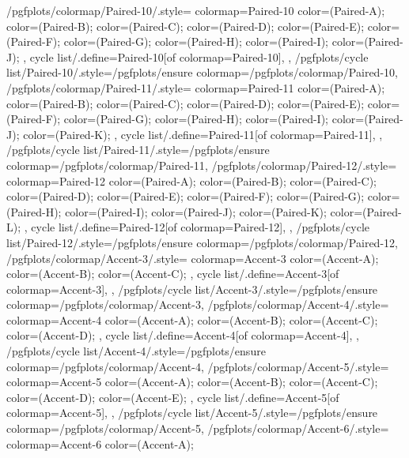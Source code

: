 {  /pgfplots/colormap/Paired-10/.style={
    colormap={Paired-10}{
      color=(Paired-A);
      color=(Paired-B);
      color=(Paired-C);
      color=(Paired-D);
      color=(Paired-E);
      color=(Paired-F);
      color=(Paired-G);
      color=(Paired-H);
      color=(Paired-I);
      color=(Paired-J);
    },
    cycle list/.define={Paired-10}{[of colormap=Paired-10]},
  },
  /pgfplots/cycle list/Paired-10/.style={/pgfplots/ensure colormap={/pgfplots/colormap/Paired-10}},
  /pgfplots/colormap/Paired-11/.style={
    colormap={Paired-11}{
      color=(Paired-A);
      color=(Paired-B);
      color=(Paired-C);
      color=(Paired-D);
      color=(Paired-E);
      color=(Paired-F);
      color=(Paired-G);
      color=(Paired-H);
      color=(Paired-I);
      color=(Paired-J);
      color=(Paired-K);
    },
    cycle list/.define={Paired-11}{[of colormap=Paired-11]},
  },
  /pgfplots/cycle list/Paired-11/.style={/pgfplots/ensure colormap={/pgfplots/colormap/Paired-11}},
  /pgfplots/colormap/Paired-12/.style={
    colormap={Paired-12}{
      color=(Paired-A);
      color=(Paired-B);
      color=(Paired-C);
      color=(Paired-D);
      color=(Paired-E);
      color=(Paired-F);
      color=(Paired-G);
      color=(Paired-H);
      color=(Paired-I);
      color=(Paired-J);
      color=(Paired-K);
      color=(Paired-L);
    },
    cycle list/.define={Paired-12}{[of colormap=Paired-12]},
  },
  /pgfplots/cycle list/Paired-12/.style={/pgfplots/ensure colormap={/pgfplots/colormap/Paired-12}},
  /pgfplots/colormap/Accent-3/.style={
    colormap={Accent-3}{
      color=(Accent-A);
      color=(Accent-B);
      color=(Accent-C);
    },
    cycle list/.define={Accent-3}{[of colormap=Accent-3]},
  },
  /pgfplots/cycle list/Accent-3/.style={/pgfplots/ensure colormap={/pgfplots/colormap/Accent-3}},
  /pgfplots/colormap/Accent-4/.style={
    colormap={Accent-4}{
      color=(Accent-A);
      color=(Accent-B);
      color=(Accent-C);
      color=(Accent-D);
    },
    cycle list/.define={Accent-4}{[of colormap=Accent-4]},
  },
  /pgfplots/cycle list/Accent-4/.style={/pgfplots/ensure colormap={/pgfplots/colormap/Accent-4}},
  /pgfplots/colormap/Accent-5/.style={
    colormap={Accent-5}{
      color=(Accent-A);
      color=(Accent-B);
      color=(Accent-C);
      color=(Accent-D);
      color=(Accent-E);
    },
    cycle list/.define={Accent-5}{[of colormap=Accent-5]},
  },
  /pgfplots/cycle list/Accent-5/.style={/pgfplots/ensure colormap={/pgfplots/colormap/Accent-5}},
  /pgfplots/colormap/Accent-6/.style={
    colormap={Accent-6}{
      color=(Accent-A);
}}}
